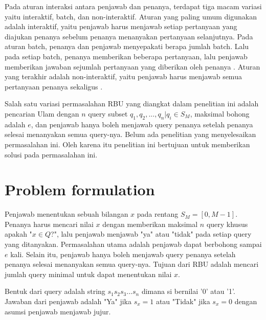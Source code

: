 \documentclass[conference,compsoc]{IEEEtran}
\begin{document}
Pada aturan interaksi antara penjawab dan penanya, terdapat tiga macam variasi yaitu interaktif, batch, dan non-interaktif. Aturan yang paling umum digunakan adalah interaktif, yaitu penjawab harus menjawab setiap pertanyaan yang diajukan penanya sebelum penanya menanyakan pertanyaan selanjutnya. Pada aturan batch, penanya dan penjawab menyepakati berapa jumlah batch. Lalu pada setiap batch, penanya memberikan beberapa pertanyaan, lalu penjawab memberikan jawaban sejumlah pertanyaan yang diberikan oleh penanya \cite{Cicalese2000}. Aturan yang terakhir adalah non-interaktif, yaitu penjawab harus menjawab semua pertanyaan penanya sekaligus \cite{Macula1997}.


Salah satu variasi permasalahan RBU yang diangkat dalam penelitian ini adalah pencarian Ulam dengan $n$ query subset ${q_1,q_2,...,q_n} | q_i \in S_M$, maksimal bohong adalah $e$, dan penjawab hanya boleh menjawab query penanya setelah penanya selesai menanyakan semua query-nya. Belum ada penelitian yang menyelesaikan permasalahan ini. Oleh karena itu penelitian ini bertujuan untuk memberikan solusi pada permasalahan ini.

\section{Problem formulation}

Penjawab menentukan sebuah bilangan $x$ pada rentang $S_M=[0,M-1]$. Penanya harus mencari nilai $x$ dengan memberikan maksimal $n$ query khusus apakah "$x \in Q$?", lalu penjawab menjawab "ya" atau "tidak" pada setiap query yang ditanyakan. Permasalahan utama adalah penjawab dapat berbohong sampai $e$ kali. Selain itu, penjawab hanya boleh menjawab query penanya setelah penanya selesai menanyakan semua query-nya. Tujuan dari RBU adalah mencari jumlah query minimal untuk dapat menentukan nilai $x$.

Bentuk dari query adalah string $s_1s_2s_3...s_n$ dimana si bernilai '0' atau '1'. Jawaban dari penjawab adalah "Ya" jika $s_x=1$ atau "Tidak" jika $s_x=0$ dengan asumsi penjawab menjawab jujur.
\end{document}

